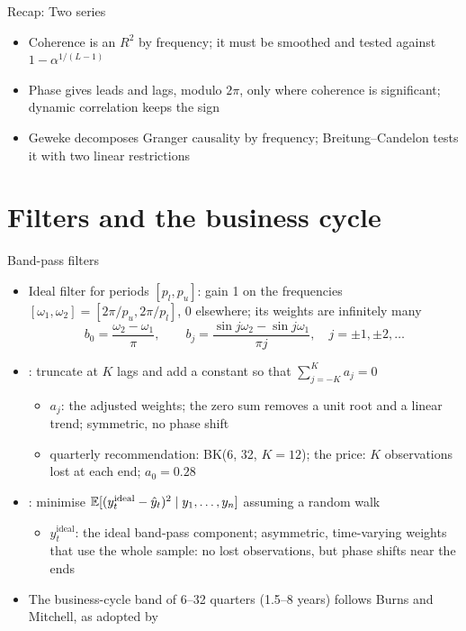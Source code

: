 \begin{frame}{Recap: Two series}
\itemsize{\small}
\begin{itemize}
    \item Coherence is an $R^2$ by frequency; it must be smoothed and tested against $1 - \alpha^{1/(L-1)}$
    \item Phase gives leads and lags, modulo $2\pi$, only where coherence is significant; dynamic correlation keeps the sign
    \item Geweke decomposes Granger causality by frequency; Breitung--Candelon tests it with two linear restrictions
\end{itemize}
\end{frame}


\section{Filters and the business cycle}

\begin{frame}{Band-pass filters}
\itemsize{\small}
\begin{itemize}
    \item Ideal filter for periods $[p_l, p_u]$: gain 1 on the frequencies $[\omega_1, \omega_2] = [2\pi/p_u, 2\pi/p_l]$, 0 elsewhere; its weights are infinitely many
    \[ b_0 = \frac{\omega_2 - \omega_1}{\pi}, \qquad b_j = \frac{\sin j\omega_2 - \sin j\omega_1}{\pi j}, \quad j = \pm1, \pm2, \dots \]
    \item {}: truncate at $K$ lags and add a constant so that $\sum_{j=-K}^Ka_j = 0$
    \begin{itemize}
        \item $a_j$: the adjusted weights; the zero sum removes a unit root and a linear trend; symmetric, no phase shift
        \item quarterly recommendation: BK(6, 32, $K = 12$); the price: $K$ observations lost at each end; $a_0 = 0.28$
    \end{itemize}
    \item {}: minimise $\mathbb{E}[(y^{\mathrm{ideal}}_t - \hat y_t)^2 \mid y_1, \dots, y_n]$ assuming a random walk
    \begin{itemize}
        \item $y^{\mathrm{ideal}}_t$: the ideal band-pass component; asymmetric, time-varying weights that use the whole sample: no lost observations, but phase shifts near the ends
    \end{itemize}
    \item The business-cycle band of 6--32 quarters (1.5--8 years) follows Burns and Mitchell, as adopted by 
\end{itemize}
\end{frame}

